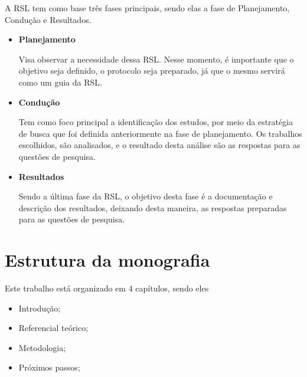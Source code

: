 A RSL tem como base três fases principais, sendo elas a fase de Planejamento, Condução e Resultados.

\begin{itemize}
	\item \textbf{Planejamento}
	
	Visa observar a necessidade dessa RSL. Nesse momento, é importante que o objetivo seja definido, o protocolo seja preparado, já que o mesmo servirá como um guia da RSL.
	
	\item \textbf{Condução}
	
	Tem como foco principal a identificação dos estudos, por meio da estratégia de busca que foi definida anteriormente na fase de planejamento. Os trabalhos escolhidos, são analisados, e o resultado desta análise são as respostas para as questões de pesquisa.
	
	
	\item \textbf{Resultados}
	
	Sendo a última fase da RSL, o objetivo desta fase é a documentação e descrição dos resultados, deixando desta maneira, as respostas preparadas para as questões de pesquisa.
\end{itemize}

\section{Estrutura da monografia}

Este trabalho está organizado em 4 capítulos, sendo eles

\begin{itemize}
	\item Introdução;
	
	\item Referencial teórico;
	
	\item Metodologia;
	
	\item Próximos passos;
\end{itemize}
